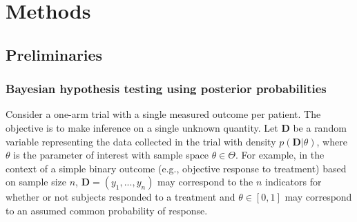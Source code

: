 \documentclass[12pt]{article}
\begin{document}
\section{Methods}\label{sec:methods}

\subsection{Preliminaries}\label{sec:preliminaries}
\subsubsection{Bayesian hypothesis testing using posterior probabilities}
Consider a one-arm trial with a single measured outcome per patient. The objective is to make inference on a single unknown quantity. Let $\mathbf{D}$ be a random variable representing the data collected in the trial with density $p(\mathbf{D}|\theta)$, where $\theta$ is the parameter of interest with sample space $\theta\in\Theta$. 
%
For example, in the context of a simple binary outcome (e.g., objective response to treatment) based on sample size $n$, $\mathbf{D} = \left(y_1,...,y_n\right)$ may correspond to the $n$ indicators for whether or not subjects responded to a treatment and $\theta\in[0,1]$ may correspond to an assumed common probability of response.
\end{document}
